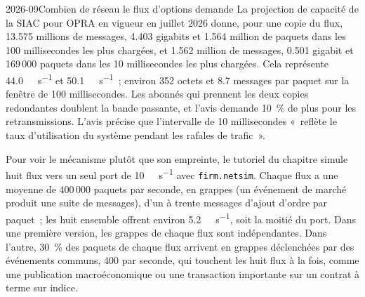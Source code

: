 \begin{dated}{2026-09}{Combien de réseau le flux d'options demande}\label{dat:nw:networking-for-trading:opra}
La projection de capacité de la SIAC pour OPRA en vigueur en juillet 2026 donne, pour une copie du flux, 13.575 millions de messages, 4.403
gigabits et 1.564 million de paquets dans les 100 millisecondes les plus chargées, et 1.562 million de messages, 0.501 gigabit et 169\,000
paquets dans les 10 millisecondes les plus chargées. Cela représente \qty{44.0}{\giga\bit\per\second} et \qty{50.1}{\giga\bit\per\second}~; environ 352
octets et 8.7 messages par paquet sur la fenêtre de 100 millisecondes. Les abonnés qui prennent les deux copies redondantes doublent la
bande passante, et l'avis demande 10~\% de plus pour les retransmissions. L'avis précise que l'intervalle de 10 millisecondes «~reflète le taux d'utilisation du système
pendant les rafales de trafic~».
\end{dated}

Pour voir le mécanisme plutôt que son empreinte, le tutoriel du chapitre simule huit flux vers un seul port de
\qty{10}{\giga\bit\per\second} avec \texttt{firm.netsim}. Chaque flux a une moyenne de 400\,000 paquets par seconde, en grappes (un événement de marché produit une suite de messages),
d'un à trente messages d'ajout d'ordre par paquet~; les huit ensemble offrent environ
\qty{5.2}{\giga\bit\per\second}, soit la moitié du port. Dans une première version, les grappes de chaque flux sont indépendantes. Dans l'autre, 30~\% des
paquets de chaque flux arrivent en grappes déclenchées par des événements communs, 400 par seconde, qui touchent les huit flux à la fois, comme une publication
macroéconomique ou une transaction importante sur un contrat à terme sur indice.

